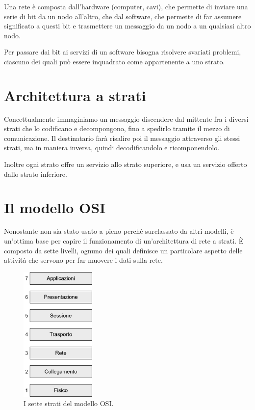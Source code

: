 Una rete è composta dall'hardware (computer, cavi), che permette di inviare una serie di bit da un nodo all'altro, che dal software, che permette di far assumere significato a questi bit e trasmettere un messaggio da un nodo a un qualsiasi altro nodo.

Per passare dai bit ai servizi di un software bisogna risolvere svariati problemi, ciascuno dei quali può essere inquadrato come appartenente a uno strato.

\section{Architettura a strati}
    Concettualmente immaginiamo un messaggio discendere dal mittente fra i diversi strati che lo codificano e decompongono, fino a spedirlo tramite il mezzo di comunicazione. Il destinatario farà risalire poi il messaggio attraverso gli stessi strati, ma in maniera inversa, quindi decodificandolo e ricomponendolo.
    
    Inoltre ogni strato offre un servizio allo strato superiore, e usa un servizio offerto dallo strato inferiore.
    
\section{Il modello OSI}
    Nonostante non sia stato usato a pieno perché surclassato da altri modelli, è un'ottima base per capire il funzionamento di un'architettura di rete a strati. È composto da sette livelli, ognuno dei quali definisce un particolare aspetto delle attività che servono per far muovere i dati sulla rete.
    
    \begin{figure}[h]
        \centering
        \includegraphics[width=0.33\textwidth]{img/strati_osi.png}
        \caption{I sette strati del modello OSI.}
        \label{fig:img1}
    \end{figure}
    
